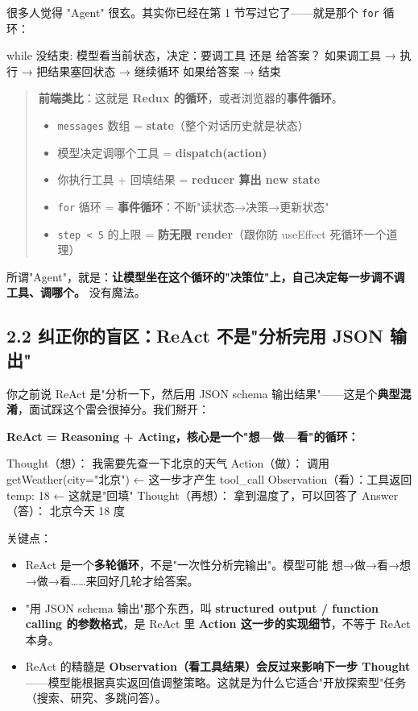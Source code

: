 很多人觉得 "Agent" 很玄。其实你已经在第 1 节写过它了——就是那个 \texttt{for} 循环：

\begin{codeblock}
while 没结束:
    模型看当前状态，决定：要调工具 还是 给答案？
    如果调工具 → 执行 → 把结果塞回状态 → 继续循环
    如果给答案 → 结束
\end{codeblock}

\begin{quote}
 \textbf{前端类比}：这就是 \textbf{Redux 的循环}，或者浏览器的\textbf{事件循环}。
\begin{itemize}[leftmargin=2em]
\item \texttt{messages} 数组 = \textbf{state}（整个对话历史就是状态）
\item 模型决定调哪个工具 = \textbf{dispatch(action)}
\item 你执行工具 + 回填结果 = \textbf{reducer 算出 new state}
\item \texttt{for} 循环 = \textbf{事件循环}：不断"读状态→决策→更新状态"
\item \texttt{step < 5} 的上限 = \textbf{防无限 render}（跟你防 useEffect 死循环一个道理）
\end{itemize}
\end{quote}

所谓"Agent"，就是：\textbf{让模型坐在这个循环的"决策位"上，自己决定每一步调不调工具、调哪个。} 没有魔法。

\subsection{2.2 纠正你的盲区：ReAct 不是"分析完用 JSON 输出"}

你之前说 ReAct 是"分析一下，然后用 JSON schema 输出结果"——这是个\textbf{典型混淆}，面试踩这个雷会很掉分。我们掰开：

\textbf{ReAct = Reasoning + Acting，核心是一个"想—做—看"的循环：}

\begin{codeblock}
Thought（想）：  我需要先查一下北京的天气
Action（做）：    调用 getWeather(city="北京")        ← 这一步才产生 tool_call
Observation（看）：工具返回 {temp: 18}                ← 这就是"回填"
Thought（再想）： 拿到温度了，可以回答了
Answer（答）：    北京今天 18 度
\end{codeblock}

关键点：

\begin{itemize}[leftmargin=2em]
\item ReAct 是一个\textbf{多轮循环}，不是"一次性分析完输出"。模型可能 想→做→看→想→做→看……来回好几轮才给答案。
\item "用 JSON schema 输出"那个东西，叫 \textbf{structured output / function calling 的参数格式}，是 ReAct 里 \textbf{Action 这一步的实现细节}，不等于 ReAct 本身。
\item ReAct 的精髓是 \textbf{Observation（看工具结果）会反过来影响下一步 Thought}——模型能根据真实返回值调整策略。这就是为什么它适合"开放探索型"任务（搜索、研究、多跳问答）。
\end{itemize}

